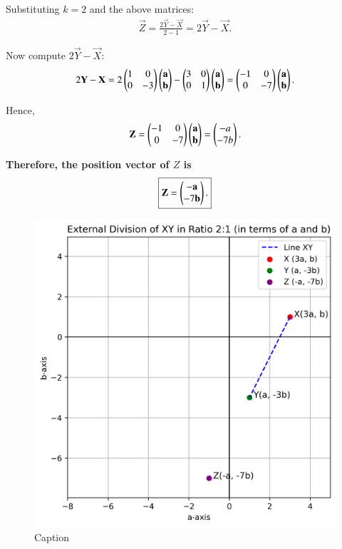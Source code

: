 \documentclass[journal]{IEEEtran}
\begin{document}
Substituting $k = 2$ and the above matrices:
\begin{align}
\vec{Z} = \frac{2\vec{Y} - \vec{X}}{2 - 1}
= 2\vec{Y} - \vec{X}.
\end{align}

Now compute $2\vec{Y} - \vec{X}$:
\begin{align}
2\mathbf{Y} - \mathbf{X} = 
2\begin{pmatrix}1 & 0 \\ 
       0 & -3\end{pmatrix}
       \begin{pmatrix}\mathbf{a} \\ \mathbf{b}\end{pmatrix}
-
\begin{pmatrix}3 & 0 \\ 
      0 & 1\end{pmatrix}
      \begin{pmatrix}\mathbf{a} \\ \mathbf{b}\end{pmatrix}
=
\begin{pmatrix}-1 & 0 \\ 
     0 & -7\end{pmatrix}
     \begin{pmatrix}\mathbf{a} \\ \mathbf{b}\end{pmatrix}.
\end{align}

Hence,
\begin{align}
\mathbf{Z} = 
\begin{pmatrix}-1 & 0 \\ 
     0 & -7\end{pmatrix}
\begin{pmatrix}\mathbf{a} \\ \mathbf{b}\end{pmatrix}
=
\begin{pmatrix}-a \\ -7b\end{pmatrix}.
\end{align}

\noindent
\textbf{Therefore, the position vector of $Z$ is}
\begin{align}
\boxed{\mathbf{Z} = \begin{pmatrix}-\mathbf{a} \\ -7\mathbf{b}\end{pmatrix}.}
\end{align}


\begin{figure}[h!]
    \centering
    \includegraphics[width=0.8\linewidth]{figs/01.png}
    \caption{Caption}
    \label{fig:placeholder}
\end{figure}
\end{document}

